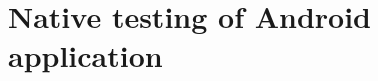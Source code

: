 \documentclass[12pt,final,oneside]{fithesis}
\begin{document}
\chapter{Native testing of Android application}



\printindex

%
%

\appendix
\end{document}
